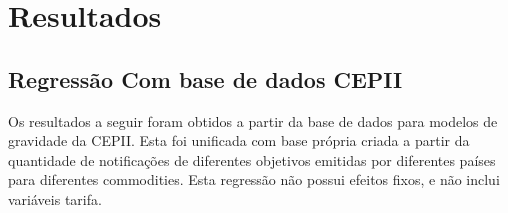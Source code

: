 \documentclass[12pt, a4paper]{article}
\begin{document}
\section{Resultados}

\subsection{Regressão Com base de dados CEPII}

Os resultados a seguir foram obtidos a partir da base de dados para modelos de gravidade da CEPII. Esta foi unificada com base própria criada a partir da quantidade de notificações de diferentes objetivos emitidas por diferentes países para diferentes commodities. Esta regressão não possui efeitos fixos, e não inclui variáveis tarifa.



\printbibliography
\end{document}
